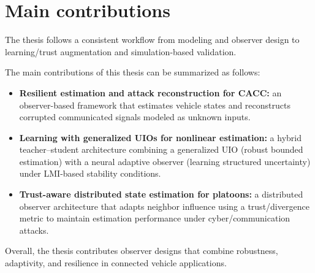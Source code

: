 



\section{Main contributions}

The thesis follows a consistent workflow from modeling and observer design to learning/trust augmentation and simulation-based validation.

The main contributions of this thesis can be summarized as follows:
\begin{itemize}
    \item \textbf{Resilient estimation and attack reconstruction for CACC:} an observer-based framework that estimates vehicle states and reconstructs corrupted communicated signals modeled as unknown inputs.
    \item \textbf{Learning with generalized UIOs for nonlinear estimation:} a hybrid teacher--student architecture combining a generalized UIO (robust bounded estimation) with a neural adaptive observer (learning structured uncertainty) under LMI-based stability conditions.
    \item \textbf{Trust-aware distributed state estimation for platoons:} a distributed observer architecture that adapts neighbor influence using a trust/divergence metric to maintain estimation performance under cyber/communication attacks.
\end{itemize}

Overall, the thesis contributes observer designs that combine robustness, adaptivity, and resilience in connected vehicle applications.

